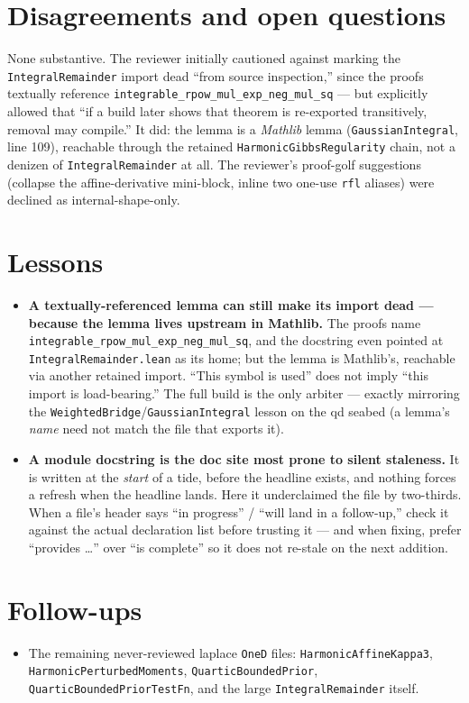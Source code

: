 \documentclass[11pt]{article}
\begin{document}
\section{Disagreements and open questions}
None substantive. The reviewer initially cautioned against marking the \texttt{IntegralRemainder}
import dead ``from source inspection,'' since the proofs textually reference
\texttt{integrable\_rpow\_mul\_exp\_neg\_mul\_sq} --- but explicitly allowed that ``if a build later
shows that theorem is re-exported transitively, removal may compile.'' It did: the lemma is a
\emph{Mathlib} lemma (\texttt{GaussianIntegral}, line 109), reachable through the retained
\texttt{HarmonicGibbsRegularity} chain, not a denizen of \texttt{IntegralRemainder} at all. The
reviewer's proof-golf suggestions (collapse the affine-derivative mini-block, inline two one-use
\texttt{rfl} aliases) were declined as internal-shape-only.

\section{Lessons}
\begin{itemize}[noitemsep]
  \item \textbf{A textually-referenced lemma can still make its import dead --- because the lemma
    lives upstream in Mathlib.} The proofs name \texttt{integrable\_rpow\_mul\_exp\_neg\_mul\_sq}, and
    the docstring even pointed at \texttt{IntegralRemainder.lean} as its home; but the lemma is
    Mathlib's, reachable via another retained import. ``This symbol is used'' does not imply ``this
    import is load-bearing.'' The full build is the only arbiter --- exactly mirroring the
    \texttt{WeightedBridge}/\texttt{GaussianIntegral} lesson on the qd seabed (a lemma's \emph{name}
    need not match the file that exports it).
  \item \textbf{A module docstring is the doc site most prone to silent staleness.} It is written at
    the \emph{start} of a tide, before the headline exists, and nothing forces a refresh when the
    headline lands. Here it underclaimed the file by two-thirds. When a file's header says ``in
    progress'' / ``will land in a follow-up,'' check it against the actual declaration list before
    trusting it --- and when fixing, prefer ``provides \dots'' over ``is complete'' so it does not
    re-stale on the next addition.
\end{itemize}

\section{Follow-ups}
\begin{itemize}[noitemsep]
  \item The remaining never-reviewed laplace \texttt{OneD} files:
    \texttt{HarmonicAffineKappa3}, \texttt{HarmonicPerturbedMoments},
    \texttt{QuarticBoundedPrior}, \texttt{QuarticBoundedPriorTestFn}, and the large
    \texttt{IntegralRemainder} itself.
\end{itemize}
\end{document}

